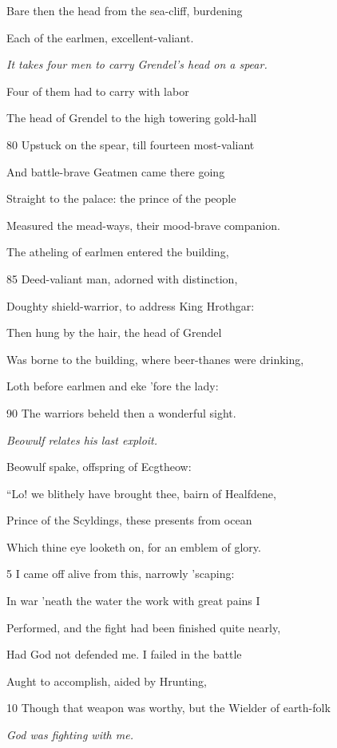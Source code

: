 Bare then the head from the sea-cliff, burdening

Each of the earlmen, excellent-valiant.

\emph{It takes four men
to carry Grendel’s
head on a spear.}

Four of them had to carry with labor

The head of Grendel to the high towering gold-hall

80
Upstuck on the spear, till fourteen most-valiant

And battle-brave Geatmen came there going

Straight to the palace: the prince of the people

Measured the mead-ways, their mood-brave companion.

The atheling of earlmen entered the building,

85
Deed-valiant man, adorned with distinction,

Doughty shield-warrior, to address King Hrothgar:

Then hung by the hair, the head of Grendel

Was borne to the building, where beer-thanes were drinking,

Loth before earlmen and eke ’fore the lady:

90
The warriors beheld then a wonderful sight.



\emph{Beowulf relates his
last exploit.}

Beowulf spake, offspring of Ecgtheow:

“Lo! we blithely have brought thee, bairn of Healfdene,

Prince of the Scyldings, these presents from ocean

Which thine eye looketh on, for an emblem of glory.

5
I came off alive from this, narrowly ’scaping:

In war ’neath the water the work with great pains I

Performed, and the fight had been finished quite nearly,

Had God not defended me. I failed in the battle

Aught to accomplish, aided by Hrunting,

10
Though that weapon was worthy, but the Wielder of earth-folk

\emph{God was fighting
with me.}

